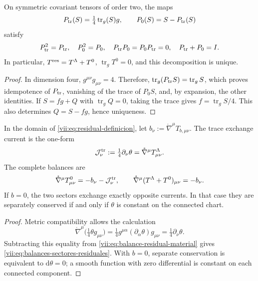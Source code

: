 \begin{proposition}
\label{vii:prop:proyectores-traza-residual}
On symmetric covariant tensors of order two, the maps
\[
 P_{\rm tr}(S)=\tfrac14\operatorname{tr}_g(S)g,
 \qquad P_0(S)=S-P_{\rm tr}(S)
\]
satisfy
\begin{equation}
 P_{\rm tr}^2=P_{\rm tr},\quad P_0^2=P_0,\quad
 P_{\rm tr}P_0=P_0P_{\rm tr}=0,\quad P_{\rm tr}+P_0=I.
 \label{vii:eq:proyectores-traza-residual}
\end{equation}
In particular, \(T^{\rm res}=T^\Lambda+T^0\),
\(\operatorname{tr}_gT^0=0\), and this decomposition is unique.
\end{proposition}
\begin{proof}
In dimension four, \(g^{\mu\nu}g_{\mu\nu}=4\). Therefore,
\(\operatorname{tr}_g(P_{\rm tr}S)=\operatorname{tr}_gS\), which
proves idempotence of \(P_{\rm tr}\), vanishing of the trace
of \(P_0S\), and, by expansion, the other identities.
If \(S=fg+Q\) with \(\operatorname{tr}_gQ=0\), taking the trace
gives \(f=\operatorname{tr}_gS/4\). This also determines
\(Q=S-fg\), hence uniqueness.
\end{proof}

\begin{theorem}
\label{vii:thm:intercambio-traza-residual}
In the domain of \eqref{vii:eq:residual-definicion}, let
\(b_\nu:=\mathring\nabla^\mu T_{b,\mu\nu}\). The trace
exchange current is the one-form
\begin{equation}
 \mathcal J^{\rm tr}_\nu
 :=\tfrac14\partial_\nu\theta
 =\mathring\nabla^\mu T^\Lambda_{\mu\nu}.
 \label{vii:eq:corriente-intercambio-traza}
\end{equation}
The complete balances are
\begin{equation}
 \mathring\nabla^\mu T^0_{\mu\nu}
       =-b_\nu-\mathcal J^{\rm tr}_\nu,
 \qquad
 \mathring\nabla^\mu(T^\Lambda+T^0)_{\mu\nu}=-b_\nu.
 \label{vii:eq:balances-sectores-residuales}
\end{equation}
If \(b=0\), the two sectors exchange exactly opposite currents.
In that case they are separately conserved if and only if \(\theta\) is
constant on the connected chart.
\end{theorem}
\begin{proof}
Metric compatibility allows the calculation
\[
 \mathring\nabla^\mu\bigl(\tfrac14\theta g_{\mu\nu}\bigr)
 =\tfrac14g^{\mu\alpha}(\partial_\alpha\theta)g_{\mu\nu}
 =\tfrac14\partial_\nu\theta.
\]
Subtracting this equality from \eqref{vii:eq:balance-residual-material} gives
\eqref{vii:eq:balances-sectores-residuales}. With \(b=0\), separate
conservation is equivalent to \(\mathrm d\theta=0\); a smooth
function with zero differential is constant on each connected component.
\end{proof}

